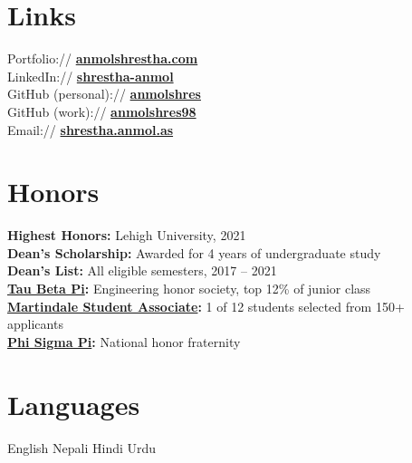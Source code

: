 \documentclass[]{deedy-resume-openfont}
\begin{document}
\begin{minipage}[t]{0.33\textwidth}


\section{Links}
Portfolio://  \href{https://www.anmolshrestha.com/}{\bf anmolshrestha.com} \\
LinkedIn://  \href{https://www.linkedin.com/in/shrestha-anmol}{\bf shrestha-anmol} \\
GitHub (personal):// \href{https://github.com/anmolshres}{\bf anmolshres} \\
GitHub (work):// \href{https://github.com/anmolshres98}{\bf anmolshres98} \\
Email://  \href{mailto:shrestha.anmol.as@proton.me}{\bf shrestha.anmol.as}
\sectionsep


\section{Honors}
{\bf Highest Honors:} Lehigh University, 2021 \\
{\bf Dean's Scholarship:} Awarded for 4 years of undergraduate study \\
{\bf Dean's List:} All eligible semesters, 2017 – 2021 \\
{\bf \href{https://www.tbp.org/home.cfm}{Tau Beta Pi}:} Engineering honor society, top 12\% of junior class \\
{\bf \href{https://business.lehigh.edu/centers/martindale-center/programs/martindale-student-associates-honors-program}{Martindale Student Associate}:} 1 of 12 students selected from 150+ applicants \\
{\bf \href{https://phisigmapi.org/}{Phi Sigma Pi}:} National honor fraternity
\sectionsep


\section{Languages}
English \textbullet{} Nepali \textbullet{} Hindi \textbullet{} Urdu
\sectionsep

\end{minipage}
\end{document}
